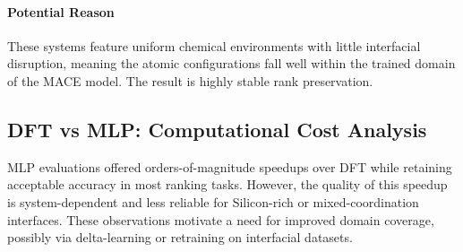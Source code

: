 \paragraph{Potential Reason}

These systems feature uniform chemical environments with little interfacial disruption, meaning the atomic
configurations fall well within the trained domain of the MACE model. The result is highly stable rank preservation.

\subsection{DFT vs MLP: Computational Cost Analysis}

MLP evaluations offered orders-of-magnitude speedups over DFT while retaining acceptable accuracy in most ranking
tasks. However, the quality of this speedup is system-dependent and less reliable for Silicon-rich or
mixed-coordination interfaces. These observations motivate a need for improved domain coverage, possibly via
delta-learning or retraining on interfacial datasets.
